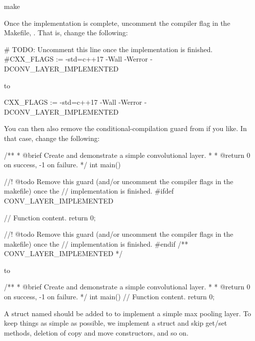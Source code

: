 \begin{shell}
make
\end{shell}

\noindent Once the implementation is complete, uncomment the compiler flag  in the
Makefile, . That is, change the following:

\begin{makecode}
# TODO: Uncomment this line once the implementation is finished.
#CXX_FLAGS := -std=c++17 -Wall -Werror -DCONV_LAYER_IMPLEMENTED
\end{makecode}

\noindent to

\begin{makecode}
CXX_FLAGS := -std=c++17 -Wall -Werror -DCONV_LAYER_IMPLEMENTED
\end{makecode}

\noindent You can then also remove the conditional-compilation guard 
from  if you like. In that case, change the following:

\begin{cppcode}
/**
 * @brief Create and demonstrate a simple convolutional layer.
 *
 * @return 0 on success, -1 on failure.
 */
int main()
{
//! @todo Remove this guard (and/or uncomment the compiler flags in the makefile) once the
//        implementation is finished.
#ifdef CONV_LAYER_IMPLEMENTED

    // Function content.
    return 0;

//! @todo Remove this guard (and/or uncomment the compiler flags in the makefile) once the
//        implementation is finished.
#endif /** CONV_LAYER_IMPLEMENTED */
}
\end{cppcode}

\noindent to

\begin{cppcode}
/**
 * @brief Create and demonstrate a simple convolutional layer.
 *
 * @return 0 on success, -1 on failure.
 */
int main()
{
    // Function content.
    return 0;
}
\end{cppcode}

\label{c7:set:2}\label{c7:app:b}

\label{c7:ex:2}
A struct named  should be added to
 to implement a simple max pooling layer.
To keep things as simple as possible, we implement a struct and skip get/set methods, deletion of
copy and move constructors, and so on.

